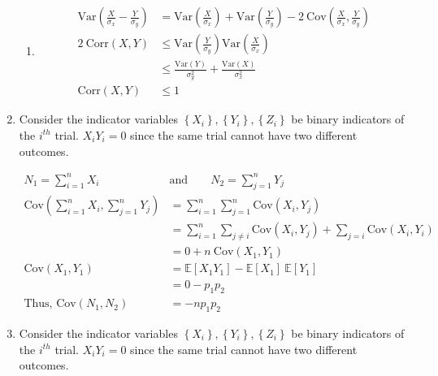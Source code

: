 \begin{enumerate}
\begin{enumerate}
			\item \begin{align}
				\mathrm{Var}\left(\frac{X}{\sigma_x} - \frac{Y}{\sigma_y}\right) &=\mathrm{Var}\left(\frac{X}{\sigma_x}\right) +  \mathrm{Var}\left(\frac{Y}{\sigma_y}\right) - 2\ \mathrm{Cov}\left(\frac{X}{\sigma_x}, \frac{Y}{\sigma_y}\right)  \nonumber \\
				2\ \mathrm{Corr}(X, Y) &\leq  \mathrm{Var}\left(\frac{Y}{\sigma_y}\right)  \mathrm{Var}\left(\frac{X}{\sigma_x}\right) \\
				&\leq  \frac{\mathrm{Var}(Y)}{\sigma_y^2} + \frac{\mathrm{Var}(X)}{\sigma_x^2} \\
				\mathrm{Corr}(X, Y) &\leq  1 
			\end{align}
		\end{enumerate}
	
	
	\item Consider the indicator variables $ \left\{X_i\right\}, \left\{Y_i\right\}, \left\{Z_i\right\} $ be binary indicators of the $ i^{th} $ trial. $ X_i Y_i  = 0$ since the same trial cannot have two different outcomes.
	
		\begin{align}
			N_1 = \sum\limits_{i = 1}^{n} X_i \qquad &\text{and} \qquad N_2 = \sum\limits_{j = 1}^{n} Y_j\qquad   \nonumber \\
			\mathrm{Cov}\left(\sum\limits_{i = 1}^{n} X_i, \sum\limits_{j = 1}^{n} Y_j\right) &= \sum\limits_{i = 1}^{n} \sum\limits_{j = 1}^{n} \mathrm{Cov}(X_i, Y_j) \nonumber \\
			&= \sum\limits_{i = 1}^{n} \sum\limits_{j \neq i} \mathrm{Cov}(X_i, Y_j) + \sum\limits_{j = i} \mathrm{Cov}(X_i, Y_i) \nonumber \\
			&= 0 + n\ \mathrm{Cov}(X_1, Y_1) \\
			\mathrm{Cov}(X_1, Y_1) &= \mathbb{E}[X_1 Y_1] - \mathbb{E}[X_1]\ \mathbb{E}[Y_1] \nonumber \\
			&= 0 - p_1 p_2 \\
			\text{Thus, } \mathrm{Cov}(N_1, N_2) &= - n p_1 p_2
		\end{align}
	
	
	\item Consider the indicator variables $ \left\{X_i\right\}, \left\{Y_i\right\}, \left\{Z_i\right\} $ be binary indicators of the $ i^{th} $ trial. $ X_i Y_i  = 0$ since the same trial cannot have two different outcomes.
	

\end{enumerate}
